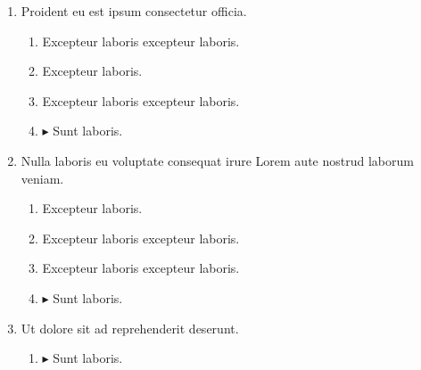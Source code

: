 \documentclass[a4paper,12pt]{article}
\begin{document}
\begin{enumerate}[label=\textbf{\arabic*.}]
\begin{multicols}{2}
\begin{enumerate}
		\item  Excepteur laboris excepteur laboris.
    
		\item  Excepteur laboris excepteur laboris.
  
		\item $\blacktriangleright$  Sunt laboris.
    
	\end{enumerate}

\end{multicols}
\item Proident eu est ipsum consectetur officia.
\begin{multicols}{2}
	\begin{enumerate}
		\item  Excepteur laboris excepteur laboris.
  
		\item  Excepteur laboris.
    
		\item  Excepteur laboris excepteur laboris.
    
		\item $\blacktriangleright$  Sunt laboris.
    
	\end{enumerate}

\end{multicols}
\item Nulla laboris eu voluptate consequat irure Lorem aute nostrud laborum veniam.
\begin{multicols}{2}
	\begin{enumerate}
		\item  Excepteur laboris.
    
		\item  Excepteur laboris excepteur laboris.
  
		\item  Excepteur laboris excepteur laboris.
    
		\item $\blacktriangleright$  Sunt laboris.
    
	\end{enumerate}

\end{multicols}
\item Ut dolore sit ad reprehenderit deserunt.
\begin{multicols}{2}
	\begin{enumerate}
		\item $\blacktriangleright$  Sunt laboris.
    

\end{enumerate}
\end{multicols}
\end{enumerate}
\end{document}
